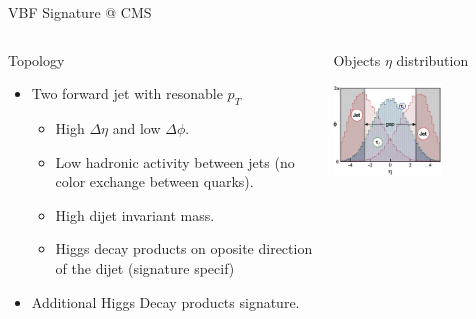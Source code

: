 \documentclass[8pt]{beamer}
\begin{document}
\begin{frame}{VBF Signature @ CMS}
\begin{columns}
\begin{block}{Topology}
      \begin{itemize}
        \item Two forward jet with resonable $p_T$
        \begin{itemize}
          \item High $\Delta\eta$ and low $\Delta\phi$.
          \item Low hadronic activity between jets (no color exchange between quarks).
          \item High dijet invariant mass.
          \item Higgs decay products on oposite direction of the dijet (signature specif)
        \end{itemize}
        \item Additional Higgs Decay products signature.
      \end{itemize}

    \end{block}

    \begin{block}{Objects $\eta$ distribution}
      
      \begin{center}
        \includegraphics[width=0.60\textwidth]{img/ObjectsRapidityGap.jpeg} 
      \end{center}

    \end{block}

  \end{columns}

\end{frame}
\end{document}
